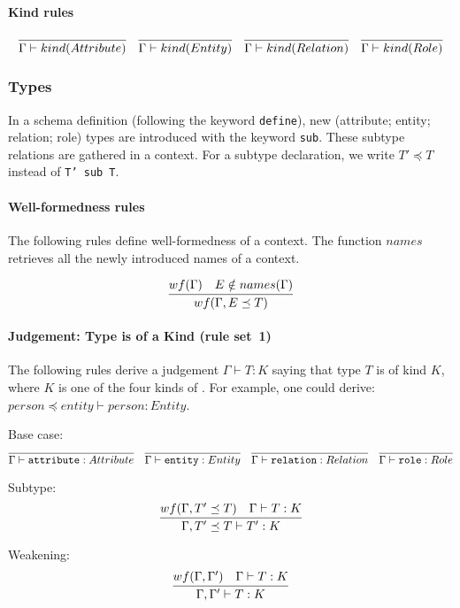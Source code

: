 \documentclass{article}
\begin{document}
\paragraph{Kind rules}


$$
\infer{\Gamma \vdash kind(Attribute)}{}
\quad
\infer{\Gamma \vdash kind(Entity)}{}
\quad
\infer{\Gamma \vdash kind(Relation)}{}
\quad
\infer{\Gamma \vdash kind(Role)}{}
$$



\subsubsection{Types}\label{sec:structure_types}

In a schema definition (following the keyword \texttt{define}), new
(attribute; entity; relation; role) types are introduced with the keyword
\texttt{sub}. These subtype relations are gathered in a context. For a subtype
declaration, we write $T' \preceq T$ instead of \texttt{T' sub T}.

\paragraph{Well-formedness rules} The following rules define well-formedness
of a context. The function $names$ retrieves all the newly introduced names of
a context.

$$
  \infer{wf(\Gamma, E \preceq T)}{
  wf(\Gamma) & E \notin names(\Gamma)
}
$$


\paragraph{Judgement: Type is of a Kind (rule set~1)}
The following rules derive a judgement $\Gamma \vdash T: K$ saying that type
$T$ is of kind $K$, where $K$ is one of the four kinds of
. For example, one could derive: 
$person \preceq entity \vdash person: Entity$.

Base case:
$$
\infer{\Gamma \vdash \mathtt{attribute} : Attribute}{}
\quad
\infer{\Gamma \vdash \mathtt{entity} : Entity}{}
\quad
\infer{\Gamma \vdash \mathtt{relation} : Relation}{}
\quad
\infer{\Gamma \vdash \mathtt{role} : Role}{}
$$

Subtype:
$$
\infer{\Gamma, T' \preceq T \vdash T' : K}{
  wf(\Gamma, T' \preceq T) & \Gamma \vdash T : K 
}
$$

Weakening:
$$
\infer{\Gamma, \Gamma' \vdash T : K}{
  wf(\Gamma, \Gamma')
  & 
  \Gamma \vdash T : K
}
$$
\end{document}
